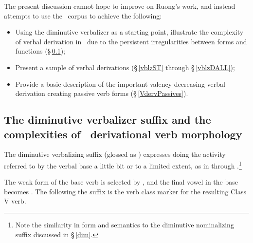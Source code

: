 The present discussion cannot hope to improve on Ruong’s work, and instead attempts to use the \PSDP\ corpus to achieve the following: 
\begin{itemize}
\item{Using the diminutive verbalizer  as a starting point, illustrate the complexity of verbal derivation in \PS\ due to the persistent irregularities between forms and functions (§\,\ref{verbDIM});}
\item{Present a sample of verbal derivations (§\,\ref{vblzST} through §\,\ref{vblzDALL});}
\item{Provide a basic description of the important valency-decreasing verbal derivation creating passive verb forms (§\,\ref{VdervPassives}).}
\end{itemize}



\subsection[The diminutive verbalizer suffix \It{-tj}]{The diminutive verbalizer suffix  and the complexities of \PS\ derivational verb morphology}\label{verbDIM}
The diminutive verbalizing suffix  (glossed as ) expresses doing the activity referred to by the verbal base a little bit or to a limited extent, as in  through .\footnote{Note the similarity in form and semantics to the diminutive nominalizing suffix  discussed in §\,\ref{dim}.} %
\ea\label{verbDIMex1}
\z
\ea\label{verbDIMex2}
\z
\ea\label{verbDIMex3}
\z

The weak form of the base verb is selected by , and the final vowel in the base becomes . 
The  following the  suffix is the verb class marker for the resulting Class V verb. %

